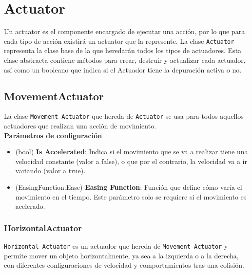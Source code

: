 \section{Actuator}

Un actuator es el componente encargado de ejecutar una acción, por lo que para cada tipo de acción existirá un actuator que la represente.
La clase \texttt{Actuator} representa la clase base de la que heredarán todos los tipos de actuadores.
Esta clase abstracta contiene métodos para crear, destruir y actualizar cada actuador, así como un booleano que indica si el Actuador tiene la depuración activa o no.\\

\subsection{MovementActuator}
La clase \texttt{Movement Actuator} que hereda de \texttt{Actuator} se usa para todos aquellos actuadores que realizan una acción de movimiento. \\

\textbf{Parámetros de configuración}
\begin{itemize}
	\item (bool) \textbf{Is Accelerated}: Indica si el movimiento que se va a realizar tiene una velocidad constante (valor a false), o que por el contrario, la velocidad va a ir variando (valor a true).
	\item (EasingFunction.Ease) \textbf{Easing Function}: Función que define cómo varía el movimiento en el tiempo. Este parámetro solo se requiere si el movimiento es acelerado.
\end{itemize}

\subsubsection{HorizontalActuator}
\texttt{Horizontal Actuator} es un actuador que hereda de \texttt{Movement Actuator} y permite mover un objeto horizontalmente, ya sea a la izquierda o a la derecha, con diferentes configuraciones de velocidad y comportamientos tras una colisión.\\

